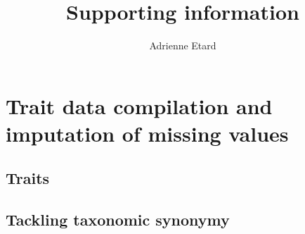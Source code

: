 \documentclass[11pt]{report}
\begin{document}
\title{Supporting information}
\author{Adrienne Etard}

\maketitle

\section{Trait data compilation and imputation of missing values}

\subsection{Traits}
\subsection{Tackling taxonomic synonymy}
\end{document}
